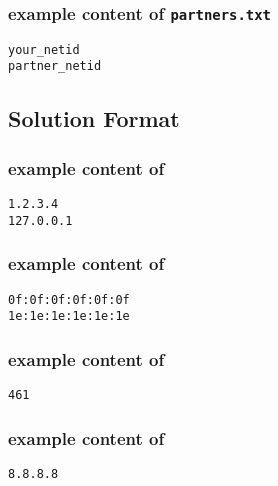 \subsubsection*{example content of \texttt{partners.txt}}
\begin{mdframed}
\begin{Verbatim}
your_netid
partner_netid
\end{Verbatim}
\end{mdframed}

\subsection*{Solution Format}

\hypertarget{ipformat}{}
\subsubsection*{example content of \texttt{\hyperlink{cp1macip}{\fileip}}}
\begin{mdframed}
\begin{Verbatim}
1.2.3.4
127.0.0.1
\end{Verbatim}
\end{mdframed}

\hypertarget{macformat}{}
\subsubsection*{example content of \texttt{\hyperlink{cp1macip}{\filemac}}}
\begin{mdframed}
\begin{Verbatim}
0f:0f:0f:0f:0f:0f
1e:1e:1e:1e:1e:1e
\end{Verbatim}
\end{mdframed}

\hypertarget{tcpformat}{}
\subsubsection*{example content of \texttt{\hyperlink{cp1tcp}{\filetcp}}}
\begin{mdframed}
\begin{Verbatim}
461
\end{Verbatim}
\end{mdframed}

\hypertarget{gwformat}{}
\subsubsection*{example content of \texttt{\hyperlink{cp1gw}{\filegw}}}
\begin{mdframed}
\begin{Verbatim}
8.8.8.8
\end{Verbatim}
\end{mdframed}

